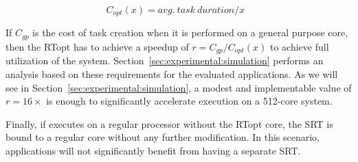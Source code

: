 \begin{equation}
  \text{$C_{opt}(x) = avg.\ task\ duration / x$ }
\label{eq.create}
\end{equation}

If $C_{gp}$ is the cost of task creation when it is performed on a general purpose core, then the RTopt has to achieve a speedup of $r = C_{gp}/C_{opt}(x)$ to achieve full utilization of the system. 
Section~\ref{sec:experimental:simulation} performs an analysis based on these requirements for the evaluated applications. 
As we will see in Section~\ref{sec:experimental:simulation}, a modest and implementable value of $r=16\times$ is enough to significantly accelerate execution on a 512-core system.

Finally, if {\proposal} executes on a regular processor without the RTopt core, the SRT is bound to a regular core without any further modification. In this scenario, applications will not significantly benefit from having a separate SRT.



